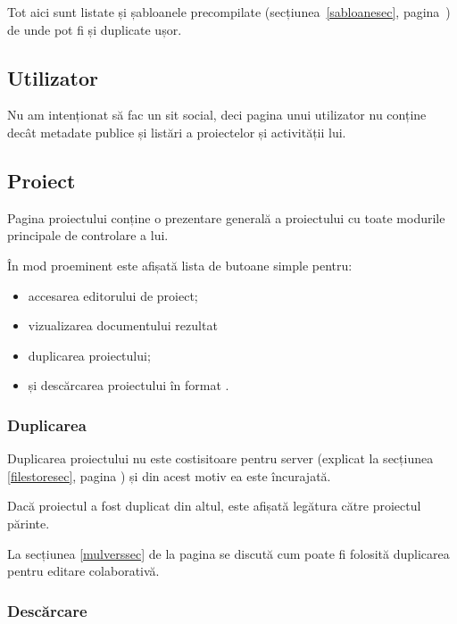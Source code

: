 \documentclass[a4wide,12pt]{report}
\newcommand{\acr}[1]{{\textsmaller[1]{\textsc{#1}}}} %
\begin{document}
Tot aici sunt listate și șabloanele precompilate (secțiunea~\ref{sabloanesec},
pagina~\pageref{sabloanesec}) de unde pot fi și duplicate ușor.

\subsection{Utilizator}

Nu am intenționat să fac un sit social, deci pagina unui utilizator nu conține
decât metadate publice și listări a proiectelor și activității lui.

\subsection{Proiect}

Pagina proiectului conține o prezentare generală a proiectului cu toate modurile
principale de controlare a lui.

În mod proeminent este afișată lista de butoane simple pentru:

\begin{itemize}

\item accesarea editorului de proiect;

\item vizualizarea documentului \acr{PDF} rezultat

\item duplicarea proiectului;

\item și descărcarea proiectului în format \acr{ZIP}.

\end{itemize}

\subsubsection{Duplicarea}

Duplicarea proiectului nu este costisitoare pentru server (explicat la secțiunea
\ref{filestoresec}, pagina \pageref{filestoresec}) și din acest motiv ea este
încurajată.

Dacă proiectul a fost duplicat din altul, este afișată legătura către proiectul
părinte.

La secțiunea \ref{mulverssec} de la pagina \pageref{mulverssec} se discută cum
poate fi folosită duplicarea pentru editare colaborativă.

\subsubsection{Descărcare}
\end{document}

